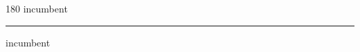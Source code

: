 
\begin{frame}
\begin{center}
\begin{turn}{180}
{\fontsize{2.5cm}{1em}\selectfont incumbent}
\end{turn}
\vspace{1em}\par  
\hrule
\vspace{1em}\par  
{\fontsize{2.5cm}{1em}\selectfont incumbent}
\end{center}
\end{frame}
